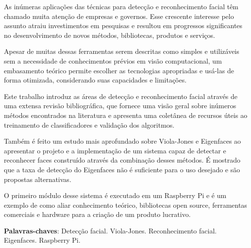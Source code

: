 
\setlength{\absparsep}{18pt} %
\begin{resumo}
As inúmeras aplicações das técnicas para detecção e reconhecimento facial têm chamado muita atenção de empresas e governos. Esse crescente interesse pelo assunto atraiu investimentos em pesquisas e resultou em progressos significantes no desenvolvimento de novos métodos, bibliotecas, produtos e serviços.

Apesar de muitas dessas ferramentas serem descritas como simples e utilizáveis sem a necessidade de conhecimentos prévios em visão computacional, um embasamento teórico permite escolher as tecnologias apropriadas e usá-las de forma otimizada, considerando suas capacidades e limitações.

Este trabalho introduz as áreas de detecção e reconhecimento facial através de uma extensa revisão bibliográfica, que fornece uma visão geral sobre inúmeros métodos encontrados na literatura e apresenta uma coletânea de recursos úteis ao treinamento de classificadores e validação dos algoritmos.

Também é feito um estudo mais aprofundado sobre Viola-Jones e Eigenfaces ao apresentar o projeto e a implementação de um sistema capaz de detectar e reconhecer faces construído através da combinação desses métodos. É mostrado que a taxa de detecção do Eigenfaces não é suficiente para o uso desejado e são propostas alternativas.

O primeiro módulo desse sistema é executado em um Raspberry Pi e é um exemplo de como aliar conhecimento teórico, bibliotecas open source, ferramentas comerciais e hardware para a criação de um produto lucrativo.

 \textbf{Palavras-chaves}: Detecção facial. Viola-Jones. Reconhecimento facial. Eigenfaces. Raspberry Pi.
\end{resumo}

